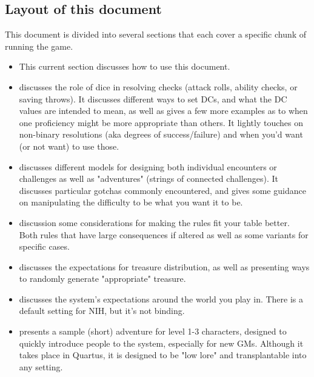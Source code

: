 \documentclass[10pt,twoside,openany,bg=none]{dndbook}
\begin{document}
\subsection{Layout of this document}
This document is divided into several sections that each cover a specific chunk of running the game.
\begin{itemize}
    \item This current section discusses how to use this document.
    \item {} discusses the role of dice in resolving checks (attack rolls, ability checks, or saving throws). It discusses different ways to set DCs, and what the DC values are intended to mean, as well as gives a few more examples as to when one proficiency might be more appropriate than others. It lightly touches on non-binary resolutions (aka degrees of success/failure) and when you'd want (or not want) to use those.
    \item {} discusses different models for designing both individual encounters or challenges as well as "adventures" (strings of connected challenges). It discusses particular gotchas commonly encountered, and gives some guidance on manipulating the difficulty to be what you want it to be.
    \item {} discussion some considerations for making the rules fit your table better. Both rules that have large consequences if altered as well as some variants for specific cases.
    \item {} discusses the expectations for treasure distribution, as well as presenting ways to randomly generate "appropriate" treasure.
    \item {} discusses the system's expectations around the world you play in. There is a default setting for NIH, but it's not binding.
    \item {} presents a sample (short) adventure for level 1-3 characters, designed to quickly introduce people to the system, especially for new GMs. Although it takes place in Quartus, it is designed to be "low lore" and transplantable into any setting.
\end{itemize}
\end{document}
